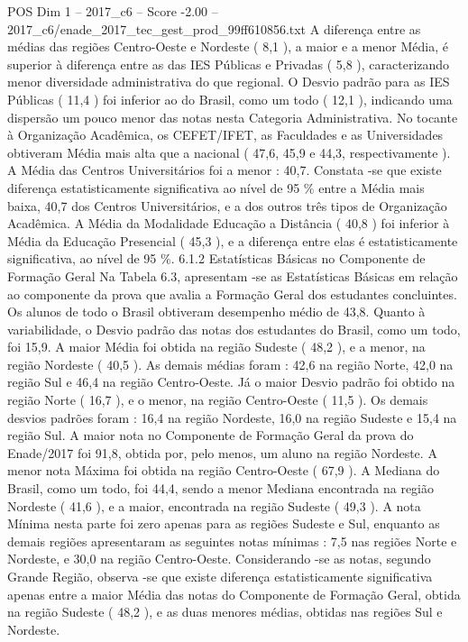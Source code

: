 \begin{textsample}{POS Dim 1 – 2017\_c6 – Score -2.00 – 2017\_c6/enade\_2017\_tec\_gest\_prod\_99ff610856.txt}
A diferença entre as médias das regiões Centro-Oeste e Nordeste ( 8,1 ), a maior e a menor Média, é superior à diferença entre as das IES Públicas e Privadas ( 5,8 ), caracterizando menor diversidade administrativa do que regional.
O Desvio padrão para as IES Públicas ( 11,4 ) foi inferior ao do Brasil, como um todo ( 12,1 ), indicando uma dispersão um pouco menor das notas nesta Categoria Administrativa.
No tocante à Organização Acadêmica, os CEFET/IFET, as Faculdades e as Universidades obtiveram Média mais alta que a nacional ( 47,6, 45,9 e 44,3, respectivamente ).
A Média das Centros Universitários foi a menor : 40,7.
Constata -se que existe diferença estatisticamente significativa ao nível de 95 \% entre a Média mais baixa, 40,7 dos Centros Universitários, e a dos outros três tipos de Organização Acadêmica.
A Média da Modalidade Educação a Distância ( 40,8 ) foi inferior à Média da Educação Presencial ( 45,3 ), e a diferença entre elas é estatisticamente significativa, ao nível de 95 \%. 6.1.2 Estatísticas Básicas no Componente de Formação Geral Na Tabela 6.3, apresentam -se as Estatísticas Básicas em relação ao componente da prova que avalia a Formação Geral dos estudantes concluintes.
Os alunos de todo o Brasil obtiveram desempenho médio de 43,8.
Quanto à variabilidade, o Desvio padrão das notas dos estudantes do Brasil, como um todo, foi 15,9.
A maior Média foi obtida na região Sudeste ( 48,2 ), e a menor, na região Nordeste ( 40,5 ).
As demais médias foram : 42,6 na região Norte, 42,0 na região Sul e 46,4 na região Centro-Oeste.
Já o maior Desvio padrão foi obtido na região Norte ( 16,7 ), e o menor, na região Centro-Oeste ( 11,5 ).
Os demais desvios padrões foram : 16,4 na região Nordeste, 16,0 na região Sudeste e 15,4 na região Sul.
A maior nota no Componente de Formação Geral da prova do Enade/2017 foi 91,8, obtida por, pelo menos, um aluno na região Nordeste.
A menor nota Máxima foi obtida na região Centro-Oeste ( 67,9 ).
A Mediana do Brasil, como um todo, foi 44,4, sendo a menor Mediana encontrada na região Nordeste ( 41,6 ), e a maior, encontrada na região Sudeste ( 49,3 ).
A nota Mínima nesta parte foi zero apenas para as regiões Sudeste e Sul, enquanto as demais regiões apresentaram as seguintes notas mínimas : 7,5 nas regiões Norte e Nordeste, e 30,0 na região Centro-Oeste.
Considerando -se as notas, segundo Grande Região, observa -se que existe diferença estatisticamente significativa apenas entre a maior Média das notas do Componente de Formação Geral, obtida na região Sudeste ( 48,2 ), e as duas menores médias, obtidas nas regiões Sul e Nordeste.

\end{textsample}
